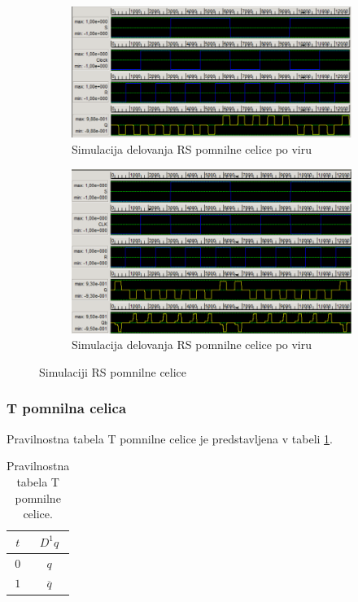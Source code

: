 \documentclass[a4paper, 11pt]{article}
\begin{document}
\begin{figure}[h!]
	\begin{subfigure}[b]{\textwidth}
	\includegraphics[width=\textwidth]{../img/vir_4/sim_sr.png}
	\caption{Simulacija delovanja RS pomnilne celice po viru \cite{quantum_dot}}
	\label{fig-rs-1-sim}
	\end{subfigure}
	\begin{subfigure}[b]{\textwidth}
	\includegraphics[width=\textwidth]{../img/vir_5/sim_rs.png}
	\caption{Simulacija delovanja RS pomnilne celice po viru \cite{a_novel_approach}}
	\label{fig-rs-2-sim}
	\end{subfigure}
	\caption{Simulaciji RS pomnilne celice}
	\label{fig-rs-sim}
\end{figure}

\subsubsection{T pomnilna celica}
Pravilnostna tabela T pomnilne celice je predstavljena v tabeli \ref{tab-t}.
\begin{table}[h!]
	\centering
	\small
	\begin{tabular}{c|c}
	$t$ & $D^1q$ \\
	\hline
	$0$ & $q$ \\
	$1$ & $\overline{q}$ \\
	\end{tabular}
	\caption{Pravilnostna tabela T pomnilne celice.}
	\label{tab-t}
\end{table}
\end{document}
